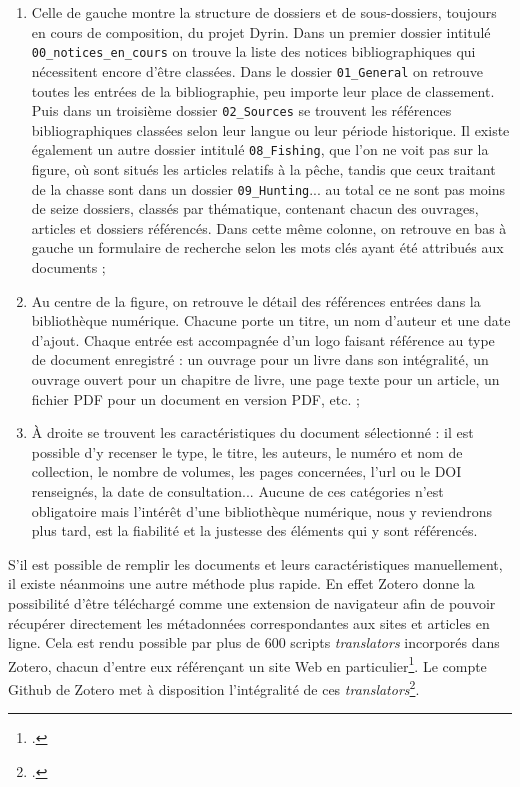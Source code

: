 \documentclass[a4paper,12pt,twoside]{book}
\begin{document}
\begin{enumerate}
    \item Celle de gauche montre la structure de dossiers et de sous-dossiers, toujours en cours de composition, du projet Dyrin. Dans un premier dossier intitulé \texttt{00\_notices\_en\_cours} on trouve la liste des notices bibliographiques qui nécessitent encore d'être classées. Dans le dossier \texttt{01\_General} on retrouve toutes les entrées de la bibliographie, peu importe leur place de classement. Puis dans un troisième dossier \texttt{02\_Sources} se trouvent les références bibliographiques classées selon leur langue ou leur période historique. Il existe également un autre dossier intitulé \texttt{08\_Fishing}, que l'on ne voit pas sur la figure, où sont situés les articles relatifs à la pêche, tandis que ceux traitant de la chasse sont dans un dossier \texttt{09\_Hunting}... au total ce ne sont pas moins de seize dossiers, classés par thématique, contenant chacun des ouvrages, articles et dossiers référencés. Dans cette même colonne, on retrouve en bas à gauche un formulaire de recherche selon les mots clés ayant été attribués aux documents ;
    \item Au centre de la figure, on retrouve le détail des références entrées dans la bibliothèque numérique. Chacune porte un titre, un nom d'auteur et une date d'ajout. Chaque entrée est accompagnée d'un logo faisant référence au type de document enregistré : un ouvrage pour un livre dans son intégralité, un ouvrage ouvert pour un chapitre de livre, une page texte pour un article, un fichier PDF pour un document en version PDF, etc. ;
    \item À droite se trouvent les caractéristiques du document sélectionné : il est possible d'y recenser le type, le titre, les auteurs, le numéro et nom de collection, le nombre de volumes, les pages concernées, l'url ou le DOI renseignés, la date de consultation... Aucune de ces catégories n'est obligatoire mais l'intérêt d'une bibliothèque numérique, nous y reviendrons plus tard, est la fiabilité et la justesse des éléments qui y sont référencés. 
\end{enumerate}

S'il est possible de remplir les documents et leurs caractéristiques manuellement, il existe néanmoins une autre méthode plus \og rapide\fg. En effet Zotero donne la possibilité d'être téléchargé comme une extension de navigateur afin de pouvoir récupérer directement les métadonnées correspondantes aux sites et articles en ligne. Cela est rendu possible par plus de 600 scripts \textit{translators} incorporés dans Zotero, chacun d'entre eux référençant un site Web en particulier\footcite{translators}. Le compte Github de Zotero met à disposition l'intégralité de ces \textit{translators}\footcite{githubzotero}.
\end{document}
